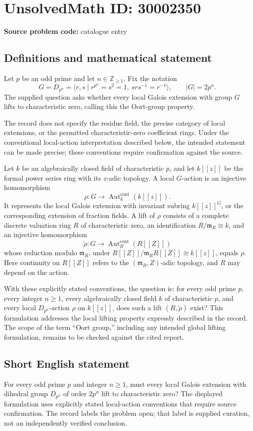 \documentclass[11pt]{article}
\newcommand{\Z}{\mathbb{Z}}
\begin{document}
\section*{UnsolvedMath ID: 30002350}
\textbf{Source problem code:} catalogue entry
\subsection{Definitions and mathematical statement}
Let \(p\) be an odd prime and let \(n\in\Z_{\geq 1}\). Fix the notation
\[
G=D_{p^n}=\langle r,s\mid r^{p^n}=s^2=1,\ srs^{-1}=r^{-1}\rangle,
\qquad |G|=2p^n.
\]
The supplied question asks whether every local Galois extension with group \(G\) lifts to characteristic zero, calling this the Oort-group property.

The record does not specify the residue field, the precise category of local extensions, or the permitted characteristic-zero coefficient rings. Under the conventional local-action interpretation described below, the intended statement can be made precise; these conventions require confirmation against the source.

Let \(k\) be an algebraically closed field of characteristic \(p\), and let \(k[[z]]\) be the formal power series ring with its \(z\)-adic topology. A local \(G\)-action is an injective homomorphism
\[
\rho:G\longrightarrow\operatorname{Aut}^{\mathrm{cont}}_k(k[[z]]).
\]
It represents the local Galois extension with invariant subring \(k[[z]]^G\), or the corresponding extension of fraction fields. A lift of \(\rho\) consists of a complete discrete valuation ring \(R\) of characteristic zero, an identification \(R/\mathfrak m_R\cong k\), and an injective homomorphism
\[
\widetilde\rho:G\longrightarrow\operatorname{Aut}^{\mathrm{cont}}_R(R[[Z]])
\]
whose reduction modulo \(\mathfrak m_R\), under \(R[[Z]]/\mathfrak m_RR[[Z]]\cong k[[z]]\), equals \(\rho\). Here continuity on \(R[[Z]]\) refers to the \((\mathfrak m_R,Z)\)-adic topology, and \(R\) may depend on the action.

With these explicitly stated conventions, the question is: for every odd prime \(p\), every integer \(n\geq1\), every algebraically closed field \(k\) of characteristic \(p\), and every local \(D_{p^n}\)-action \(\rho\) on \(k[[z]]\), does such a lift \((R,\widetilde\rho)\) exist? This formulation addresses the local lifting property expressly described in the record. The scope of the term ``Oort group,'' including any intended global lifting formulation, remains to be checked against the cited report.
\subsection{Short English statement}
For every odd prime \(p\) and integer \(n\geq1\), must every local Galois extension with dihedral group \(D_{p^n}\) of order \(2p^n\) lift to characteristic zero? The displayed formulation uses explicitly stated local-action conventions that require source confirmation. The record labels the problem open; that label is supplied curation, not an independently verified conclusion.
\end{document}
